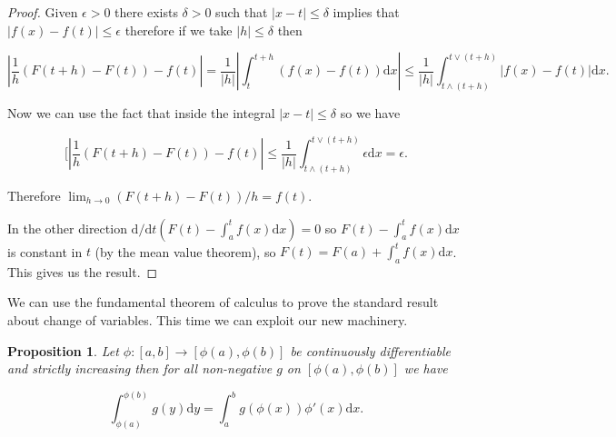 \documentclass[
]{book}
\newtheorem{proposition}{Proposition}[chapter]
\theoremstyle{definition}
\theoremstyle{definition}
\theoremstyle{definition}
\theoremstyle{definition}
\theoremstyle{remark}
\begin{document}
\begin{proof}
Given \(\epsilon >0\) there exists \(\delta >0\) such that \(|x-t| \leq \delta\) implies that \(|f(x) -f(t)| \leq \epsilon\) therefore if we take \(|h| \leq \delta\) then

\[ \left| \frac{1}{h}(F(t+h) - F(t)) - f(t)\right| = \frac{1}{|h|} \left|\int_t^{t+h}(f(x) - f(t)) \mathrm{d}x\right| \leq \frac{1}{|h|} \int_{t \wedge (t+h)}^{t \vee (t+h)} |f(x) - f(t)| \mathrm{d}x. \]

Now we can use the fact that inside the integral \(|x-t| \leq \delta\) so we have

\[ [\left| \frac{1}{h}(F(t+h) - F(t)) - f(t)\right| \leq \frac{1}{|h|} \int_{t \wedge (t+h)}^{t \vee (t+h)} \epsilon \mathrm{d}x = \epsilon. \]

Therefore \(\lim_{h \rightarrow 0} (F(t+h)-F(t))/h = f(t)\).

In the other direction \(\mathrm{d}/\mathrm{d}t(F(t) - \int_a^t f(x) \mathrm{d}x) = 0\) so \(F(t) - \int_a^t f(x) \mathrm{d}x\) is constant in \(t\) (by the mean value theorem), so \(F(t) = F(a) + \int_a^t f(x) \mathrm{d}x\). This gives us the result.
\end{proof}

We can use the fundamental theorem of calculus to prove the standard result about change of variables. This time we can exploit our new machinery.

\begin{proposition}
Let \(\phi: [a,b] \rightarrow [\phi(a), \phi(b)]\) be continuously differentiable and strictly increasing then for all non-negative \(g\) on \([\phi(a), \phi(b)]\) we have

\[ \int_{\phi(a)}^{\phi(b)}g(y) \mathrm{d}y = \int_a^b g(\phi(x)) \phi'(x) \mathrm{d}x. \]
\end{proposition}
\end{document}
